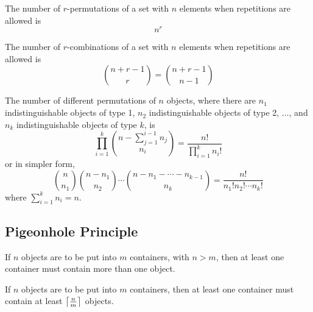 \begin{theorem}
    The number of $r$-permutations of a set with $n$ elements when repetitions are allowed is
    \[
        n^r
    \]
\end{theorem}

\begin{theorem}
    The number of $r$-combinations of a set with $n$ elements when repetitions are allowed is
    \[
        \binom{n+r-1}{r} = \binom{n+r-1}{n-1}
    \]
    
\end{theorem}

\begin{corollary}
    The number of different permutations of $n$ objects, where there are $n_1$ indistinguishable objects
    of type 1, $n_2$ indistinguishable objects of type 2, $\ldots$, and $n_k$ indistinguishable objects
    of type $k$, is
    \[
        \prod_{i=1}^{k} \binom{n-\sum_{j=1}^{i-1} n_j}{n_i} = \frac{n!}{\prod_{i=1}^k n_i!}
    \]
    or in simpler form,
    \[
        \binom{n}{n_1}\binom{n-n_1}{n_2}\cdots\binom{n-n_1-\cdots-n_{k-1}}{n_k} =
        \frac{n!}{n_1! n_2! \cdots n_k!}
    \]
    where $\sum_{i=1}^k n_i = n$.
\end{corollary}

\subsection{Pigeonhole Principle}

\begin{theorem}
    If $n$ objects are to be put into $m$ containers, with $n>m$, then at least one container
    must contain more than one object.    
\end{theorem}

\begin{corollary}
    If $n$ objects are to be put into $m$ containers, then at least one container must contain
    at least $\textstyle\left\lceil\frac{n}{m}\right\rceil$ objects.
\end{corollary}

